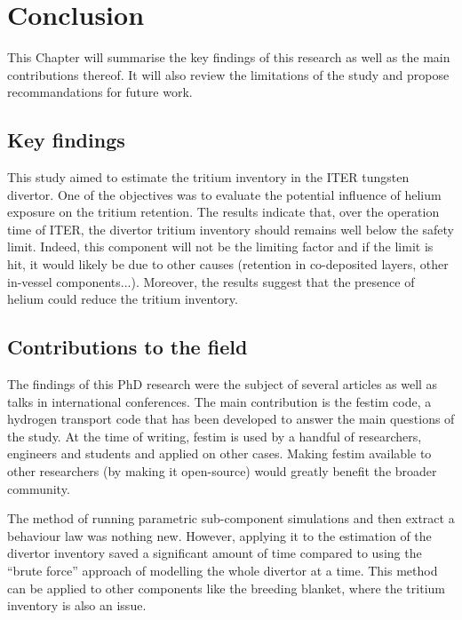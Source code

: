 \setchapterpreamble[u]{\margintoc}
\chapter{Conclusion}

This Chapter will summarise the key findings of this research as well as the main contributions thereof.
It will also review the limitations of the study and propose recommandations for future work.

\section*{Key findings}

This study aimed to estimate the tritium inventory in the ITER tungsten \gls{divertor}.
One of the objectives was to evaluate the potential influence of helium exposure on the tritium retention.
The results indicate that, over the operation time of ITER, the \gls{divertor} tritium inventory should remains well below the safety limit.
Indeed, this component will not be the limiting factor and if the limit is hit, it would likely be due to other causes (retention in co-deposited layers, other in-vessel components...).
Moreover, the results suggest that the presence of helium could reduce the tritium inventory.

\section*{Contributions to the field}
The findings of this PhD research were the subject of several articles as well as talks in international conferences.
The main contribution is the \gls{festim} code, a hydrogen transport code that has been developed to answer the main questions of the study.
At the time of writing, \gls{festim} is used by a handful of researchers, engineers and students and applied on other cases.
Making \gls{festim} available to other researchers (by making it open-source) would greatly benefit the broader community.

The method of running parametric sub-component simulations and then extract a behaviour law was nothing new.
However, applying it to the estimation of the \gls{divertor} inventory saved a significant amount of time compared to using the ``brute force'' approach of modelling the whole \gls{divertor} at a time.
This method can be applied to other components like the \gls{breeding blanket}, where the tritium inventory is also an issue.

